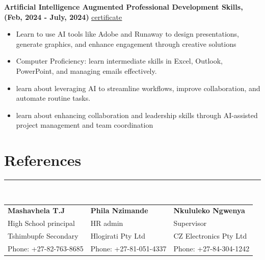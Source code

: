 \documentclass[12pt]{article}
\begin{document}
\hspace{-7mm}\textbf{Artificial Intelligence Augmented Professional Development Skills, (Feb, 2024 - July, 2024)} \hspace{10mm} \href{https://drive.google.com/file/d/16H-T0WN2AVSkl41QqBcLdgBtYbnxJytG/view?usp=sharing}{\underline{certificate}}
\vspace{-3mm}
\begin{itemize}
  \item Learn to use AI tools like Adobe and Runaway to design presentations, generate graphics, and enhance engagement through creative solutions
  \vspace{-3mm}
  \item Computer Proficiency: learn intermediate skills in Excel, Outlook, PowerPoint, and managing emails effectively.
  \vspace{-3mm}
  \item learn about leveraging AI to streamline workflows, improve collaboration, and automate routine tasks.
  \vspace{-3mm}
  \item learn about enhancing collaboration and leadership skills through AI-assisted project management and team coordination
  \vspace{-3mm}
\end{itemize}

\vspace{-3mm}\section*{\fontsize{14}{1}\selectfont\color{color_29791}References}\vspace{-9pt} 
\rule{\textwidth}{0.4pt}
\vspace{2pt}\\
\begin{tabular}{p{} p{} p{}}
  \textbf{Mashavhela T.J} & 
  \textbf{Phila Nzimande} & 
  \textbf{Nkululeko Ngwenya} \\
  High School principal & 
  HR admin& 
  Supervisor\\
  Tshimbupfe Secondary & 
  Hlogirati Pty Ltd& 
  CZ Electronics Pty Ltd\\ 
  Phone: +27-82-763-8685  & 
  Phone: +27-81-051-4337 & 
  Phone: +27-84-304-1242 \\
\end{tabular}
\end{document}
